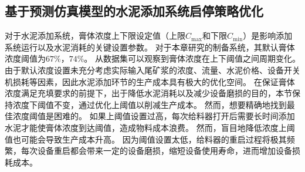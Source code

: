 
\subsection{基于预测仿真模型的水泥添加系统启停策略优化}
\label{sub:case-study2}
对于水泥添加系统，膏体浓度上下限设定值（上限$C_{\max}$和下限$C_{\min}$）是影响添加系统运行以及水泥消耗的关键设置参数。
对于本章研究的制备系统，其默认膏体浓度阈值为$67\%$，$74\%$。
从数据集可以观察到膏体浓度在上下阈值之间周期变化。
由于默认浓度设置未充分考虑实际输入尾矿浆的浓度、流量、水泥价格、设备开关机损耗等因素，因此水泥添加环节的生产成本具有极大的优化空间。
在保证膏体浓度满足充填要求的前提下，出于降低水泥消耗以及减少设备磨损的目的，本节保持浓度下阈值不变，通过优化上阈值以削减生产成本。
然而，想要精确地找到最佳浓度阈值是困难的。
如果上阈值设置过高，每次给料器打开后需要长时间添加水泥才能使膏体浓度到达阈值，造成物料成本浪费。
然而，盲目地降低浓度上阈值也可能会导致生产成本升高。
因为阈值设置太低，给料器的重启过程将极其频繁，每次设备重启都会带来一定的设备磨损，缩短设备使用寿命，进而增加设备损耗成本。

